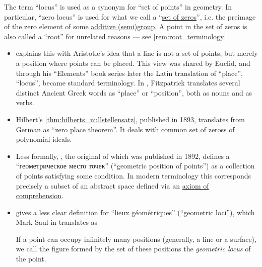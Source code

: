 \begin{remark}\label{rem:locus_terminology}
  The term \enquote{locus} is used as a synonym for \enquote{set of points} in geometry. In particular, \enquote{zero locus} is used for what we call a \enquote{\hyperref[def:zero_of_function]{set of zeros}}, i.e. the preimage of the zero element of some \hyperref[def:additive_semigroup]{additive (semi)group}. A point in the set of zeros is also called a \enquote{root} for unrelated reasons --- see \cref{rem:root_terminology}.

  \begin{itemize}
    \item \Textcite[17]{Розенфельд1963ОсновныеПонятиеГеометрии} explains this with Aristotle's idea that a line is not a set of points, but merely a position where points can be placed. This view was shared by Euclid, and through his \enquote{Elements} book series later the Latin translation of \enquote{place}, \enquote{locus}, became standard terminology. In \cite{Euclid2008Elements}, Fitzpatrick translates several distinct Ancient Greek words as \enquote{place} or \enquote{position}, both as nouns and as verbs.

    \item Hilbert's \cref{thm:hilberts_nullstellensatz}, published in 1893, translates from German as \enquote{zero place theorem}. It deals with common set of zeross of polynomial ideals.

    \item Less formally, \textcite[48]{Киселёв2004Геометрия}, the original of which was published in 1892, defines a \enquote{геометрическое место точек} (\enquote{geometric position of points}) as a collection of points satisfying some condition. In modern terminology this corresponds precisely a subset of an abstract space defined via an \hyperref[def:zfc/comprehension]{axiom of comprehension}.

    \item \Textcite[1]{Hadamard1898LeçonsdeGéométrieTome1} gives a less clear definition for \enquote{lieux géométriques} (\enquote{geometric loci}), which Mark Saul in \cite[1]{Hadamard2008LessonsInGeometryVol1} translates as
    \begin{displayquote}
      If a point can occupy infinitely many positions (generally, a line or a surface), we call the figure formed by the set of these positions the \textit{geometric locus} of the point.
    \end{displayquote}
  \end{itemize}
\end{remark}

